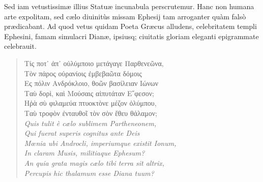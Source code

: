 \documentclass[a4paper, 11pt, oneside, polutonikogreek, latin]{article}
\begin{document}
Sed iam vetustissimæ illius Statuæ incunabula perscrutemur. Hanc non humana arte expolitam, sed cælo diuinitùs missam Ephesij tam arroganter quàm falsò prædicabant. Ad quod vetus quidam Poeta Græcus alludens, celebritatem templi Ephesini, famam simulacri Dianæ, ipsiusq; ciuitatis gloriam eleganti epigrammate celebrauit.
\begin{quote}
\hspace*{0mm}Τίς ποτ᾽ ἀπ᾽ οὐλύμποιο μετάγαγε Παρθενεῶνα,\\
\hspace*{5mm}Τὸν πάρος οὐρανίοις ἐμβεβαῶτα δόμοις\\
\hspace*{0mm}Ες πόλιν Ανδρόκλοιο, θοῶν βασίλειαν Ιώνων\\
\hspace*{5mm}Ταὺ δορὶ, καὶ Μούσαις αἰπυτάταν Ε῎φεσον;\\
\hspace*{0mm}Ηῥὰ σὺ φιλαμεύα πτυοκτὸνε μέζον ὀλύμπου,\\
\hspace*{5mm}Ταὺ τροφὸν ἐνταυθοῖ τὸν σὸν ἔθευ θάλαμον;\\

\hspace*{0mm}\emph{Quis tulit è cælo sublimem Partheneonem,}\\
\hspace*{5mm}\emph{Qui fuerat superis cognitus ante Deis}\\
\hspace*{0mm}\emph{Mœnia ubi Androcli, imperiumque existit Ionum,}\\
\hspace*{5mm}\emph{In claram Musis, militiaque Ephesum?}\\
\hspace*{0mm}\emph{An quia grata magis cælo tibi terra sit altrix,}\\
\hspace*{5mm}\emph{Percupis hic thalamum esse Diana tuum?}\\
\end{quote}
\end{document}
